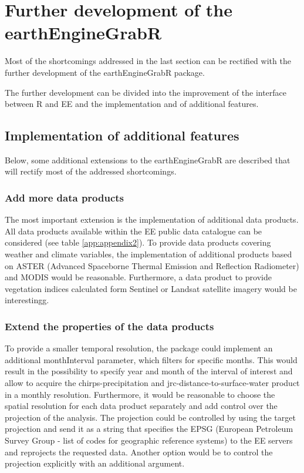 \section{Further development of the earthEngineGrabR}

Most of the shortcomings addressed in the last section can be rectified with the further development of the earthEngineGrabR package. 

The further development can be divided into the improvement of the interface between R and EE and the implementation and of additional features.

\subsection{Implementation of additional features}

Below, some additional extensions to the earthEngineGrabR are described that will rectify most of the addressed shortcomings.

\subsubsection{Add more data products}

The most important extension is the implementation of additional data products. All data products available within the EE public data catalogue can be considered (see table \ref{app:appendix2}). To provide data products covering weather and climate variables, the implementation of additional products based on ASTER (Advanced Spaceborne Thermal Emission and Reflection Radiometer) and MODIS would be reasonable. Furthermore, a data product to provide vegetation indices calculated form Sentinel or Landsat satellite imagery would be interestingg.

\subsubsection{Extend the properties of the data products}
To provide a smaller temporal resolution, the package could implement an additional monthInterval parameter, which filters for specific months. This would result in the possibility to specify year and month of the interval of interest and allow to acquire the chirps-precipitation and jrc-distance-to-surface-water product in a monthly resolution.
Furthermore, it would be reasonable to choose the spatial resolution for each data product separately and add control over the projection of the analysis. 
The projection could be controlled by using the target projection and send it as a string that specifies the EPSG (European Petroleum Survey Group - list of codes for geographic reference systems) to the EE servers and reprojects the requested data. Another option would be to control the projection explicitly with an additional argument.

